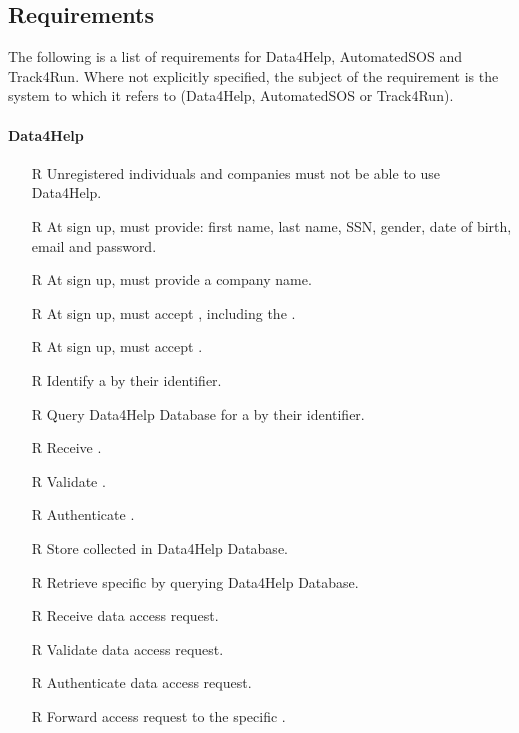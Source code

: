 \documentclass[../../../rasd.tex]{subfiles}
\begin{document}
\subsection{Requirements\label{sect:3.2.5}}
		The following is a list of requirements for Data4Help, AutomatedSOS and Track4Run. Where not explicitly specified, the subject of the requirement is the system to which it refers to (Data4Help, AutomatedSOS or Track4Run).
        \paragraph{Data4Help}
        \begin{itemize}
            \item[R\subs{1}]Unregistered individuals and companies must not be able to use Data4Help.
            \item[R\subs{2}]At sign up,  must provide: first name, last name, SSN, gender, date of birth, email and password.
            \item[R\subs{3}]At sign up,  must provide a company name.
            \item[R\subs{4}]At sign up,  must accept , including the .
            \item[R\subs{5}]At sign up,  must accept .
            \item[R\subs{6}]Identify a  by their identifier.
            \item[R\subs{7}]Query Data4Help Database for a  by their identifier.
            \item[R\subs{8}]Receive .
            \item[R\subs{9}]Validate .
            \item[R\subs{10}]Authenticate .
            \item[R\subs{11}]Store collected  in Data4Help Database.
            \item[R\subs{12}]Retrieve specific  by querying Data4Help Database.
            \item[R\subs{13}]Receive  data access request.
            \item[R\subs{14}]Validate  data access request.
            \item[R\subs{15}]Authenticate  data access request.
            \item[R\subs{16}]Forward  access request to the specific .

\end{itemize}
\end{document}
